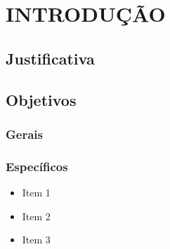 \chapter{INTRODUÇÃO}
\label{cap:introducao}



\section{Justificativa}


\section{Objetivos}
\subsection{Gerais}

\subsection{Específicos}
\begin{itemize}
    \item Item 1
    \item Item 2
    \item Item 3 
\end{itemize}

